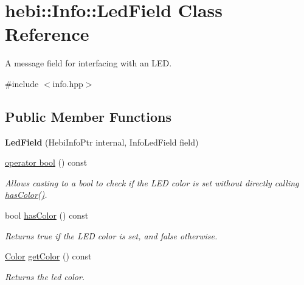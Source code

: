\hypertarget{classhebi_1_1Info_1_1LedField}{}\section{hebi\+:\+:Info\+:\+:Led\+Field Class Reference}
\label{classhebi_1_1Info_1_1LedField}


A message field for interfacing with an L\+ED.  




{\ttfamily \#include $<$info.\+hpp$>$}

\subsection*{Public Member Functions}
\begin{DoxyCompactItemize}
\item 
\mbox{\label{classhebi_1_1Info_1_1LedField_af012c0a7e7b4cbe1d41ad8a19441a157}} 
{\bfseries Led\+Field} (Hebi\+Info\+Ptr internal, Info\+Led\+Field field)
\item 
\hyperlink{classhebi_1_1Info_1_1LedField_ad01bb0b217fa57dd74e288cc70c0d59f}{operator bool} () const
\begin{DoxyCompactList}\small\item\em Allows casting to a bool to check if the L\+ED color is set without directly calling {\ttfamily \hyperlink{classhebi_1_1Info_1_1LedField_aa78e496273712fe789e5cc70b27831b4}{has\+Color()}}. \end{DoxyCompactList}\item 
\mbox{\label{classhebi_1_1Info_1_1LedField_aa78e496273712fe789e5cc70b27831b4}} 
bool \hyperlink{classhebi_1_1Info_1_1LedField_aa78e496273712fe789e5cc70b27831b4}{has\+Color} () const
\begin{DoxyCompactList}\small\item\em Returns true if the L\+ED color is set, and false otherwise. \end{DoxyCompactList}\item 
\mbox{\label{classhebi_1_1Info_1_1LedField_ad0e9274b9b4a4144303a04c7faf57c35}} 
\hyperlink{structhebi_1_1Color}{Color} \hyperlink{classhebi_1_1Info_1_1LedField_ad0e9274b9b4a4144303a04c7faf57c35}{get\+Color} () const
\begin{DoxyCompactList}\small\item\em Returns the led color. \end{DoxyCompactList}\end{DoxyCompactItemize}



